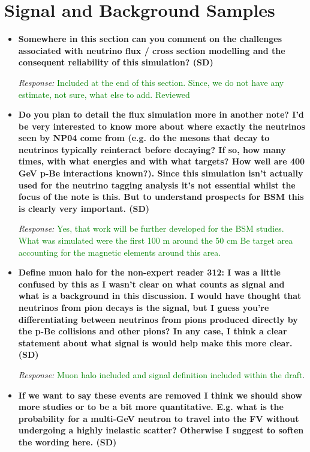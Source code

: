 \documentclass[11pt]{article}
\begin{document}
\section*{Signal and Background Samples}

\begin{itemize}[leftmargin=*]

\item \textbf{Somewhere in this section can you comment on the challenges associated with neutrino
flux / cross section modelling and the consequent reliability of this simulation? (SD)}

\textit{Response:} \textcolor{green} {Included at the end of this section. Since, we do not have any estimate, not sure, what else to add. Reviewed}

\item \textbf{Do you plan to detail the flux simulation more in another note? I’d be very interested to
know more about where exactly the neutrinos seen by NP04 come from (e.g. do the mesons
that decay to neutrinos typically reinteract before decaying? If so, how many times, with what
energies and with what targets? How well are 400 GeV p-Be interactions known?). Since this
simulation isn’t actually used for the neutrino tagging analysis it’s not essential whilst the focus
of the note is this. But to understand prospects for BSM this is clearly very important. (SD)}

\textit{Response:} \textcolor{green}{Yes, that work will be further developed for the BSM studies. What was simulated were the first 100 m around the 50 cm Be target area accounting for the magnetic elements around this area.}

\item \textbf{Define muon halo for the non-expert reader
312: I was a little confused by this as I wasn’t clear on what counts as signal and what is a
background in this discussion. I would have thought that neutrinos from pion decays is the
signal, but I guess you’re differentiating between neutrinos from pions produced directly by the
p-Be collisions and other pions? In any case, I think a clear statement about what signal is
would help make this more clear. (SD)}

\textit{Response:} \textcolor{green}{Muon halo included and signal definition included within the draft}.

\item \textbf{If we want to say these events are removed I think we should show more studies or to be a
bit more quantitative. E.g. what is the probability for a multi-GeV neutron to travel into the FV
without undergoing a highly inelastic scatter? Otherwise I suggest to soften the wording here. (SD)}


\end{itemize}
\end{document}
